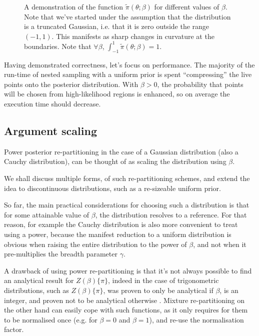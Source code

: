 \documentclass[usenatbib]{mnras}
\begin{document}
\begin{figure}
 
\caption{\label{orgc5a49ae}
A demonstration of the function \(\tilde{\pi}(\theta; \beta)\) for different values of \(\beta\). Note that we've started under the assumption that the distribution is a truncated Gaussian, i.e. that it is zero outside the range \((-1, 1)\). This manifests as sharp changes in curvature at the boundaries. Note that \(\forall \beta\), \(\int_{-1}^{1}\tilde{\pi}(\theta; \beta) = 1\).}
\end{figure}

Having demonstrated correctness, let's focus on performance. The
majority of the run-time of nested sampling with a uniform prior is
spent ``compressing'' the live points onto the posterior
distribution. With \(\beta>0\), the probability that points will be
chosen from high-likelihood regions is enhanced, so on average the
execution time should decrease. 


\subsection{Argument scaling}
\label{sec:orgd2734d4}

Power posterior re-partitioning in the case of a Gaussian
distribution (also a Cauchy distribution), can be thought of as
scaling the distribution using \(\beta\).

We shall discuss multiple forms, of such re-partitioning schemes,
and extend the idea to discontinuous distributions, such as a
re-sizeable uniform prior.  

So far, the main practical considerations for choosing such a
distribution is that for some attainable value of \(\beta\), the
distribution resolves to a reference. For that reason, for example
the Cauchy distribution is also more convenient to treat using a
power, because the manifest reduction to a uniform distribution is
obvious when raising the entire distribution to the power of
\(\beta\), and not when it pre-multiplies the breadth parameter
\(\gamma\).

A drawback of using power re-partitioning is that it's not always
possible to find an analytical result for \(Z(\beta)\{\pi\}\), indeed
in the case of trigonometric distributions, such as \(Z(\beta)\{\pi\}\),
was proven to only be analytical if \(\beta\), is an integer, and
proven not to be analytical otherwise \citep{Liouville1837}. Mixture
re-partitioning on the other hand can easily cope with such
functions, as it only requires for them to be normalised once
(e.g. for \(\beta=0\) and \(\beta=1\)), and re-use the normalisation
factor.
\end{document}

